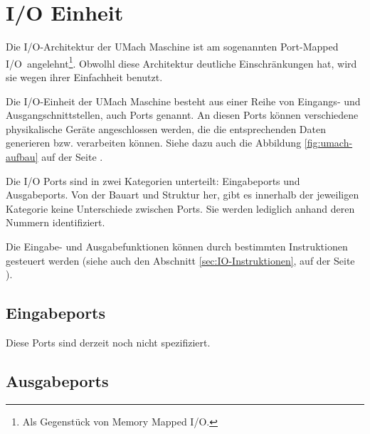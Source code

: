 \section{I/O Einheit}
\label{sec:IO-Einheit}

Die I/O-Architektur der UMach Maschine ist am sogenannten \glqq Port-Mapped
I/O\grqq\ angelehnt\footnote{Als Gegenstück von \glqq Memory Mapped I/O\grqq.}.
Obwolhl diese Architektur deutliche Einschränkungen hat, wird sie wegen ihrer
Einfachheit benutzt.


Die I/O-Einheit der UMach Maschine besteht aus einer Reihe von Eingangs- und
Ausgangschnittstellen, auch Ports genannt. An
diesen Ports können verschiedene physikalische Geräte angeschlossen werden, die
die entsprechenden Daten generieren bzw. verarbeiten können. Siehe dazu auch die
Abbildung \ref{fig:umach-aufbau} auf der Seite \pageref{fig:umach-aufbau}.


Die I/O Ports sind in zwei Kategorien unterteilt: Eingabeports und
Ausgabeports. Von der Bauart und Struktur her, gibt es innerhalb der jeweiligen
Kategorie keine Unterschiede zwischen Ports. Sie werden lediglich anhand deren
Nummern identifiziert.


Die Eingabe- und Ausgabefunktionen können durch bestimmten Instruktionen
gesteuert werden (siehe auch den Abschnitt \ref{sec:IO-Instruktionen}, auf der
Seite \pageref{sec:IO-Instruktionen}).



\subsection{Eingabeports}

Diese Ports sind derzeit noch nicht spezifiziert.



\subsection{Ausgabeports}

